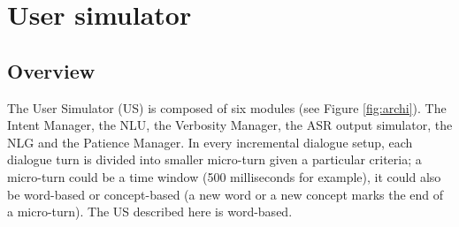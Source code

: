                 
    
\section{User simulator}
	\subsection{Overview}
    
    	The User Simulator (US) is composed of six modules (see Figure \ref{fig:archi}). The Intent Manager, the NLU, the Verbosity Manager, the ASR output simulator, the NLG and the Patience Manager. In every incremental dialogue setup, each dialogue turn is divided into smaller micro-turn given a particular criteria; a micro-turn could be a time window (500 milliseconds for example), it could also be word-based or concept-based (a new word or a new concept marks the end of a micro-turn). The US described here is word-based.
        
